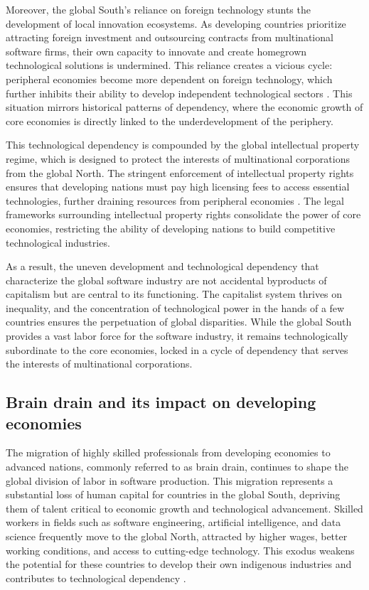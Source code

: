 Moreover, the global South's reliance on foreign technology stunts the development of local innovation ecosystems. As developing countries prioritize attracting foreign investment and outsourcing contracts from multinational software firms, their own capacity to innovate and create homegrown technological solutions is undermined. This reliance creates a vicious cycle: peripheral economies become more dependent on foreign technology, which further inhibits their ability to develop independent technological sectors \cite[pp.~101-103]{foster2011}. This situation mirrors historical patterns of dependency, where the economic growth of core economies is directly linked to the underdevelopment of the periphery.

This technological dependency is compounded by the global intellectual property regime, which is designed to protect the interests of multinational corporations from the global North. The stringent enforcement of intellectual property rights ensures that developing nations must pay high licensing fees to access essential technologies, further draining resources from peripheral economies \cite[pp.~53-55]{harvey2021}. The legal frameworks surrounding intellectual property rights consolidate the power of core economies, restricting the ability of developing nations to build competitive technological industries.

As a result, the uneven development and technological dependency that characterize the global software industry are not accidental byproducts of capitalism but are central to its functioning. The capitalist system thrives on inequality, and the concentration of technological power in the hands of a few countries ensures the perpetuation of global disparities. While the global South provides a vast labor force for the software industry, it remains technologically subordinate to the core economies, locked in a cycle of dependency that serves the interests of multinational corporations.

\subsection{Brain drain and its impact on developing economies}

The migration of highly skilled professionals from developing economies to advanced nations, commonly referred to as brain drain, continues to shape the global division of labor in software production. This migration represents a substantial loss of human capital for countries in the global South, depriving them of talent critical to economic growth and technological advancement. Skilled workers in fields such as software engineering, artificial intelligence, and data science frequently move to the global North, attracted by higher wages, better working conditions, and access to cutting-edge technology. This exodus weakens the potential for these countries to develop their own indigenous industries and contributes to technological dependency \cite[pp.~191-193]{kapur2010}.

